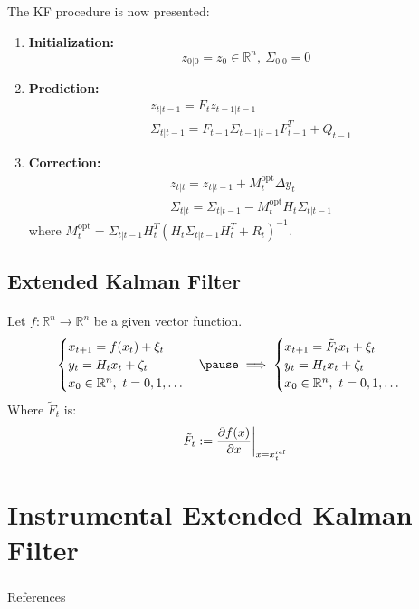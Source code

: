 \documentclass{beamer}
\theoremstyle{definition}
\theoremstyle{remark}
\theoremstyle{example}
\newif\ifinsection
\newif\ifinsubsection
\let\oldsection\section
\renewcommand{\section}{%
  \global\insectiontrue%
  \global\insubsectionfalse%
  \oldsection}
\let\oldsubsection\subsection
\renewcommand{\subsection}{%
  \global\insubsectiontrue%
  \oldsubsection}
\newcommand {\aframe}[1] {%
  \begin{frame}
    \ifinsection\frametitle{\secname}\fi
    \ifinsubsection\framesubtitle{\subsecname}\fi
  #1
  \end{frame}
}
\begin{document}
\aframe{
The KF procedure is now presented:
\begin{enumerate}
  \item \textbf{Initialization: }
  \[
  z_{0|0}=z_0\in \mathbb{R}^n, \ \Sigma_{0|0}=0
  \]
  \item \textbf{Prediction: }
  \[
  \begin{split}
    &z_{t|t-1}=F_tz_{t-1|t-1}\\
    &\Sigma_{t|t-1}=F_{t-1}\Sigma_{t-1|t-1}F_{t-1}^T+Q_{t-1}
  \end{split}
  \]
  \item \textbf{Correction: }
  \[
  \begin{split}
    &z_{t | t}=z_{t | t-1}+M_{t}^{\text{opt}} \Delta y_{t} \\
    &\Sigma_{t | t}=\Sigma_{t | t-1}-M_{t}^{\text{opt}} H_{t} \Sigma_{t | t-1}
  \end{split}
  \]
  where ${M_{t}^{\text {opt}}=\Sigma_{t | t-1} H_{t}^{T}\left(H_{t} \Sigma_{t | t-1} H_{t}^{T}+R_{t}\right)^{-1}}$.
\end{enumerate}
}

\subsection{Extended Kalman Filter}
\aframe{
  Let $f:\mathbb{R}^n \rightarrow \mathbb{R}^n$ be a given vector function.
\begin{equation}
  \begin{cases}
    x_{t+1}=f(x_t) + \xi_t&\\
    y_t=H_tx_t+\zeta_t&\\
    x_0\in \mathbb{R}^n, \ t=0,1,\ldots &
  \end{cases}
  \pause \implies
  \begin{cases}
    x_{t+1}=\tilde{F}_tx_t + \xi_t&\\
    y_t=H_tx_t+\zeta_t &\\
    x_0\in \mathbb{R}^n, \ t=0,1,\ldots &
  \end{cases}
\end{equation}
Where $\tilde{F}_t$ is:
\[
\tilde{F}_t:=\dfrac{\partial f(x)}{\partial x}\bigg|_{x=x^{{\rm ref}}_t}
\]
}

\section{Instrumental Extended Kalman Filter}
\aframe{}
\begin{frame}[allowframebreaks]{References}
  \printbibliography
\end{frame}
\end{document}
